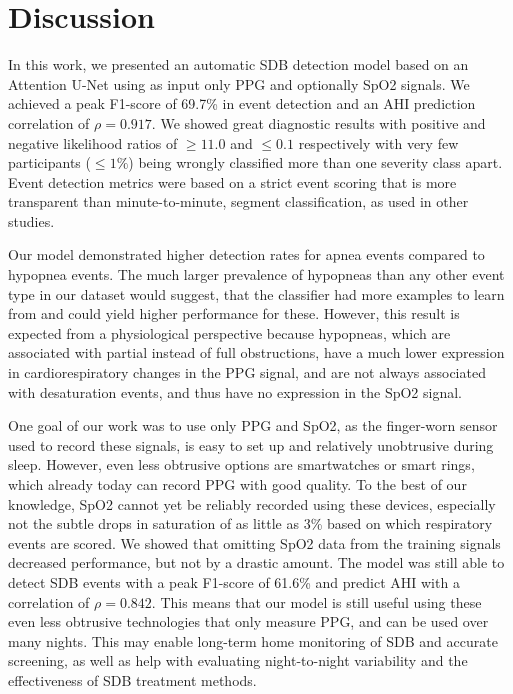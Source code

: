 \chapter{Discussion \label{Chapter-Discussion}}


In this work, we presented an automatic SDB detection model based on an Attention U-Net using as input only PPG and optionally SpO2 signals. We achieved a peak F1-score of 69.7\% in event detection and an AHI prediction correlation of $\rho = 0.917$. We showed great diagnostic results with positive and negative likelihood ratios of $\ge 11.0$ and $\le 0.1$ respectively with very few participants ($\le 1\%$) being wrongly classified more than one severity class apart. Event detection metrics were based on a strict event scoring that is more transparent than minute-to-minute, segment classification, as used in other studies.

Our model demonstrated higher detection rates for apnea events compared to hypopnea events. The much larger prevalence of hypopneas than any other event type in our dataset would suggest, that the classifier had more examples to learn from and could yield higher performance for these. However, this result is expected from a physiological perspective because hypopneas, which are associated with partial instead of full obstructions, have a much lower expression in cardiorespiratory changes in the PPG signal, and are not always associated with desaturation events, and thus have no expression in the SpO2 signal.

One goal of our work was to use only PPG and SpO2, as the finger-worn sensor used to record these signals, is easy to set up and relatively unobtrusive during sleep. However, even less obtrusive options are smartwatches or smart rings, which already today can record PPG with good quality. To the best of our knowledge, SpO2 cannot yet be reliably recorded using these devices, especially not the subtle drops in saturation of as little as 3\% based on which respiratory events are scored. 
We showed that omitting SpO2 data from the training signals decreased performance, but not by a drastic amount. The model was still able to detect SDB events with a peak F1-score of 61.6\% and predict AHI with a correlation of $\rho = 0.842$. This means that our model is still useful using these even less obtrusive technologies that only measure PPG, and can be used over many nights. This may enable long-term home monitoring of SDB and accurate screening, as well as help with evaluating night-to-night variability and the effectiveness of SDB treatment methods.

